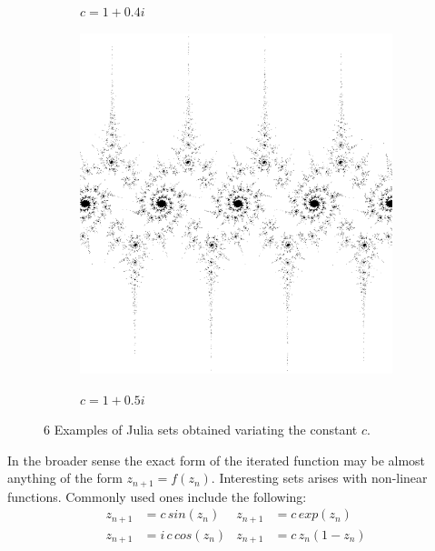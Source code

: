 \begin{figure}[!htb]
\begin{subfigure}{1.0\textwidth}
        \label{fig:julia5}
        \caption{$c=1+0.4i$}
    \end{subfigure}
    \endminipage\hfill
        \begin{subfigure}{1.0\textwidth}
        \includegraphics[width=\linewidth]{./images/opencal/julia6.png}
        \label{fig:julia6}
        \caption{$c=1+0.5i$}
    \end{subfigure}
    \endminipage
    
    \caption{6 Examples of Julia sets obtained variating the constant $c$.}
        \label{fig:julia_set_c}
\end{figure}

In the broader sense the exact form of the iterated function may be almost anything of the form $z_{n+1} = f(z_n)$. Interesting sets arises with non-linear functions. Commonly used ones include the following:
\begin{align*}
z_{n+1} &= c\, sin(z_n) & z_{n+1} &= c \,exp(z_n)\\
z_{n+1} &= i\,c\, cos(z_n) &z_{n+1} &= c\, z_n(1-z_n)
\end{align*}

